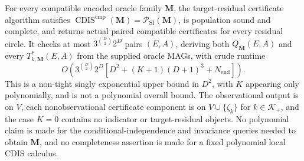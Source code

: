 For every compatible encoded oracle family \(\mathbf M\), the target-residual certificate algorithm satisfies \(\operatorname{CDIS}^{\mathrm{cmp}}(\mathbf M)=\mathcal P_{\mathrm{SI}}(\mathbf M)\), is population sound and complete, and returns actual paired compatible certificates for every residual circle.  It checks at most \(3^{\binom D2}2^D\) pairs \((E,A)\), deriving both \(Q_{\mathbf M}(E,A)\) and every \(T^*_{k,\mathbf M}(E,A)\) from the supplied oracle MAGs, with crude runtime
\[
O\!\left(3^{\binom D2}2^D
\left[D^2+(K+1)(D+1)^3+N_{\mathrm{end}}\right]\right).
\]
This is a non-tight singly exponential upper bound in \(D^2\), with \(K\) appearing only polynomially, and is not a polynomial overall bound.  The observational output is on \(V\), each nonobservational certificate component is on \(V\cup\{\zeta_k\}\) for \(k\in\mathcal K_+\), and the case \(K=0\) contains no indicator or target-residual objects.  No polynomial claim is made for the conditional-independence and invariance queries needed to obtain \(\mathbf M\), and no completeness assertion is made for a fixed polynomial local CDIS calculus.